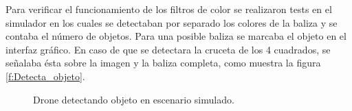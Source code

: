 

\hspace{1cm} Para verificar el funcionamiento de los filtros de color se realizaron tests en el simulador en los cuales se detectaban por separado los colores de la baliza y se contaba el n\'umero de objetos. Para una posible baliza se marcaba el objeto en el interfaz gr\'afico. En caso de que se detectara la cruceta de los 4 cuadrados, se señalaba \'esta sobre la imagen y la baliza completa, como muestra la figura \ref{f:Detecta_objeto}.

\begin{figure}[H]
 \centering
 \caption{Drone detectando objeto en escenario simulado.}
 \label{f:Drone detecta objeto. }
\end{figure} 


